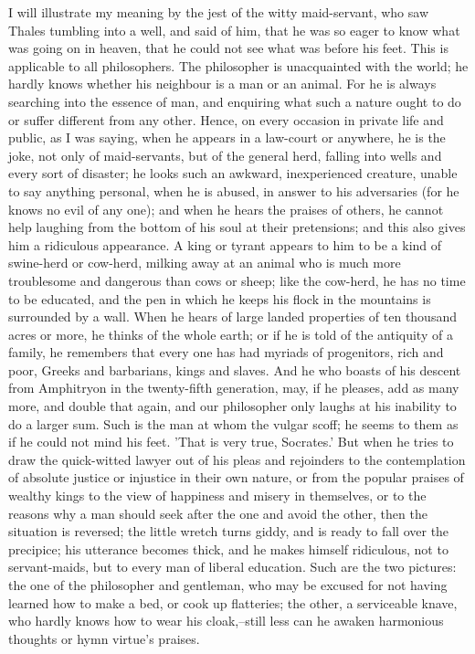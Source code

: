 I will illustrate my meaning by the jest of the witty maid-servant, who
saw Thales tumbling into a well, and said of him, that he was so eager
to know what was going on in heaven, that he could not see what was
before his feet. This is applicable to all philosophers. The philosopher
is unacquainted with the world; he hardly knows whether his neighbour is
a man or an animal. For he is always searching into the essence of man,
and enquiring what such a nature ought to do or suffer different from
any other. Hence, on every occasion in private life and public, as I was
saying, when he appears in a law-court or anywhere, he is the joke, not
only of maid-servants, but of the general herd, falling into wells
and every sort of disaster; he looks such an awkward, inexperienced
creature, unable to say anything personal, when he is abused, in answer
to his adversaries (for he knows no evil of any one); and when he hears
the praises of others, he cannot help laughing from the bottom of
his soul at their pretensions; and this also gives him a ridiculous
appearance. A king or tyrant appears to him to be a kind of swine-herd
or cow-herd, milking away at an animal who is much more troublesome and
dangerous than cows or sheep; like the cow-herd, he has no time to be
educated, and the pen in which he keeps his flock in the mountains is
surrounded by a wall. When he hears of large landed properties of ten
thousand acres or more, he thinks of the whole earth; or if he is
told of the antiquity of a family, he remembers that every one has had
myriads of progenitors, rich and poor, Greeks and barbarians, kings
and slaves. And he who boasts of his descent from Amphitryon in the
twenty-fifth generation, may, if he pleases, add as many more, and
double that again, and our philosopher only laughs at his inability to
do a larger sum. Such is the man at whom the vulgar scoff; he seems to
them as if he could not mind his feet. 'That is very true, Socrates.'
But when he tries to draw the quick-witted lawyer out of his pleas and
rejoinders to the contemplation of absolute justice or injustice in
their own nature, or from the popular praises of wealthy kings to the
view of happiness and misery in themselves, or to the reasons why a man
should seek after the one and avoid the other, then the situation is
reversed; the little wretch turns giddy, and is ready to fall over the
precipice; his utterance becomes thick, and he makes himself ridiculous,
not to servant-maids, but to every man of liberal education. Such are
the two pictures: the one of the philosopher and gentleman, who may be
excused for not having learned how to make a bed, or cook up flatteries;
the other, a serviceable knave, who hardly knows how to wear his
cloak,--still less can he awaken harmonious thoughts or hymn virtue's
praises.

